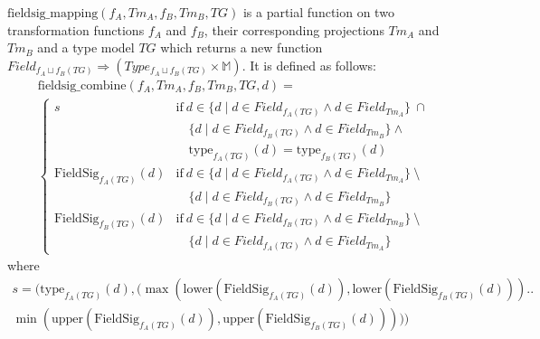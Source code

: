 \begin{defin}
\label{defin:transformation_framework:type_models_and_type_graphs:combining_transformation_functions:fieldsig_mapping}
$\mathrm{fieldsig\_\!mapping}(f_A, Tm_A, f_B, Tm_B, TG)$ is a partial function on two transformation functions $f_A$ and $f_B$, their corresponding projections $Tm_A$ and $Tm_B$ and a type model $TG$ which returns a new function $Field_{f_{A} \sqcup f_{B}(TG)} \Rightarrow (Type_{f_{A} \sqcup f_{B}(TG)} \times \mathbb{M})$. It is defined as follows:
\begin{multline*}
    \mathrm{fieldsig\_\!combine}(f_A, Tm_A, f_B, Tm_B, TG, d) = \\
        \begin{cases}
        s & \mathrm{if }\ d \in \{d \mid d \in Field_{f_{A}(TG)} \land d \in Field_{Tm_A} \}\ \cap\\&\quad\{d \mid d \in Field_{f_{B}(TG)} \land d \in Field_{Tm_B} \} \land\\&\quad\mathrm{type}_{f_{A}(TG)}(d) = \mathrm{type}_{f_{B}(TG)}(d) \\
        \mathrm{FieldSig}_{f_{A}(TG)}(d) & \mathrm{if }\ d \in \{d \mid d \in Field_{f_{A}(TG)} \land d \in Field_{Tm_A} \}\ \setminus\\&\quad\{d \mid d \in Field_{f_{B}(TG)} \land d \in Field_{Tm_B} \} \\
        \mathrm{FieldSig}_{f_{B}(TG)}(d) & \mathrm{if }\ d \in \{d \mid d \in Field_{f_{B}(TG)} \land d \in Field_{Tm_B} \}\ \setminus\\&\quad\{d \mid d \in Field_{f_{A}(TG)} \land d \in Field_{Tm_A} \}
    \end{cases}
\end{multline*}
where
\begin{equation*}
\begin{split}
    s = \bigg(\mathrm{type}_{f_{A}(TG)}(d), \Big(\max\left(\mathrm{lower}(\mathrm{FieldSig}_{f_{A}(TG)}(d)), \mathrm{lower}(\mathrm{FieldSig}_{f_{B}(TG)}(d))\right) ..\\ \min\left(\mathrm{upper}(\mathrm{FieldSig}_{f_{A}(TG)}(d)), \mathrm{upper}(\mathrm{FieldSig}_{f_{B}(TG)}(d))\right)\Big)\bigg)
\end{split}
\end{equation*}
\end{defin}

